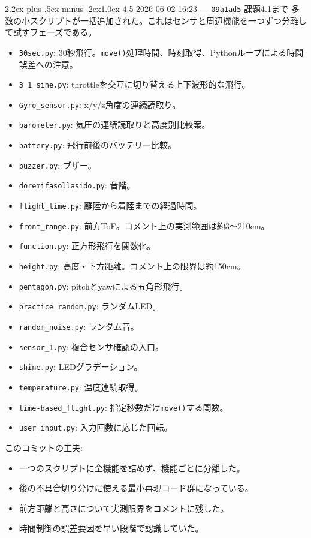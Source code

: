 \documentclass[10pt,a4paper,openany]{ltjsbook}
\makeatletter
\renewcommand\section{\@startsection{section}{1}{0pt}%
  {2.2ex plus .5ex minus .2ex}{1.0ex}%
  {\sffamily\Large\bfseries\color{ReportNavy}}}
\makeatother
\begin{document}
\section{4.5 2026-06-02 16:23 — \texttt{09a1ad5} 課題4.1まで}
多数の小スクリプトが一括追加された。これはセンサと周辺機能を一つずつ分離して試すフェーズである。\par
\begin{itemize}
\item \texttt{30sec.py}: 30秒飛行。\texttt{move()}処理時間、時刻取得、Pythonループによる時間誤差への注意。
\item \texttt{3\_1\_sine.py}: throttleを交互に切り替える上下波形的な飛行。
\item \texttt{Gyro\_sensor.py}: x/y/z角度の連続読取り。
\item \texttt{barometer.py}: 気圧の連続読取りと高度別比較案。
\item \texttt{battery.py}: 飛行前後のバッテリー比較。
\item \texttt{buzzer.py}: ブザー。
\item \texttt{doremifasollasido.py}: 音階。
\item \texttt{flight\_time.py}: 離陸から着陸までの経過時間。
\item \texttt{front\_range.py}: 前方ToF。コメント上の実測範囲は約3〜210cm。
\item \texttt{function.py}: 正方形飛行を関数化。
\item \texttt{height.py}: 高度・下方距離。コメント上の限界は約150cm。
\item \texttt{pentagon.py}: pitchとyawによる五角形飛行。
\item \texttt{practice\_random.py}: ランダムLED。
\item \texttt{random\_noise.py}: ランダム音。
\item \texttt{sensor\_1.py}: 複合センサ確認の入口。
\item \texttt{shine.py}: LEDグラデーション。
\item \texttt{temperature.py}: 温度連続取得。
\item \texttt{time-based\_flight.py}: 指定秒数だけ\texttt{move()}する関数。
\item \texttt{user\_input.py}: 入力回数に応じた回転。
\end{itemize}
このコミットの工夫:\par
\begin{itemize}
\item 一つのスクリプトに全機能を詰めず、機能ごとに分離した。
\item 後の不具合切り分けに使える最小再現コード群になっている。
\item 前方距離と高さについて実測限界をコメントに残した。
\item 時間制御の誤差要因を早い段階で認識していた。
\end{itemize}
\end{document}
